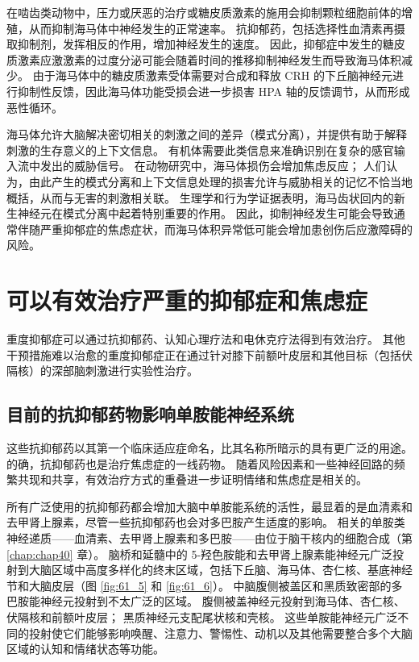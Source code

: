 在啮齿类动物中，压力或厌恶的治疗或糖皮质激素的施用会抑制颗粒细胞前体的增殖，从而抑制海马体中神经发生的正常速率。 抗抑郁药，包括选择性血清素再摄取抑制剂，发挥相反的作用，增加神经发生的速度。 因此，抑郁症中发生的糖皮质激素应激激素的过度分泌可能会随着时间的推移抑制神经发生而导致海马体积减少。 由于海马体中的糖皮质激素受体需要对合成和释放 CRH 的下丘脑神经元进行抑制性反馈，因此海马体功能受损会进一步损害 HPA 轴的反馈调节，从而形成恶性循环。

海马体允许大脑解决密切相关的刺激之间的差异（模式分离），并提供有助于解释刺激的生存意义的上下文信息。 有机体需要此类信息来准确识别在复杂的感官输入流中发出的威胁信号。 在动物研究中，海马体损伤会增加焦虑反应； 人们认为，由此产生的模式分离和上下文信息处理的损害允许与威胁相关的记忆不恰当地概括，从而与无害的刺激相关联。 生理学和行为学证据表明，海马齿状回内的新生神经元在模式分离中起着特别重要的作用。 因此，抑制神经发生可能会导致通常伴随严重抑郁症的焦虑症状，而海马体积异常低可能会增加患创伤后应激障碍的风险。


\section{可以有效治疗严重的抑郁症和焦虑症}
重度抑郁症可以通过抗抑郁药、认知心理疗法和电休克疗法得到有效治疗。 其他干预措施难以治愈的重度抑郁症正在通过针对膝下前额叶皮层和其他目标（包括伏隔核）的深部脑刺激进行实验性治疗。

\subsection{目前的抗抑郁药物影响单胺能神经系统}
这些抗抑郁药以其第一个临床适应症命名，比其名称所暗示的具有更广泛的用途。 的确，抗抑郁药也是治疗焦虑症的一线药物。 随着风险因素和一些神经回路的频繁共现和共享，有效治疗方式的重叠进一步证明情绪和焦虑症是相关的。

所有广泛使用的抗抑郁药都会增加大脑中单胺能系统的活性，最显着的是血清素和去甲肾上腺素，尽管一些抗抑郁药也会对多巴胺产生适度的影响。 相关的单胺类神经递质——血清素、去甲肾上腺素和多巴胺——由位于脑干核内的细胞合成（第 \ref{chap:chap40} 章）。 脑桥和延髓中的 5-羟色胺能和去甲肾上腺素能神经元广泛投射到大脑区域中高度多样化的终末区域，包括下丘脑、海马体、杏仁核、基底神经节和大脑皮层（图 \ref{fig:61_5} 和 \ref{fig:61_6}）。 中脑腹侧被盖区和黑质致密部的多巴胺能神经元投射到不太广泛的区域。 腹侧被盖神经元投射到海马体、杏仁核、伏隔核和前额叶皮层； 黑质神经元支配尾状核和壳核。 这些单胺能神经元广泛不同的投射使它们能够影响唤醒、注意力、警惕性、动机以及其他需要整合多个大脑区域的认知和情绪状态等功能。


